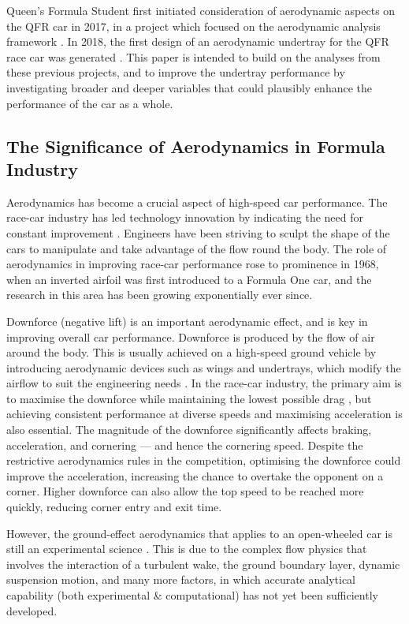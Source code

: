\noindent Queen's Formula Student first initiated consideration of aerodynamic aspects on the QFR car in 2017, in a project which focused on the aerodynamic analysis framework \cite{Corr2017MechanicalAuthor}. In 2018, the first design of an aerodynamic undertray for the QFR race car was generated \cite{McKeown2018DesignCar}. This paper is intended to build on the analyses from these previous projects, and to improve the undertray performance by investigating broader and deeper variables that could plausibly enhance the performance of the car as a whole. 

\subsection{The Significance of Aerodynamics in Formula Industry}
Aerodynamics has become a crucial aspect of high-speed car performance. The race-car industry has led technology innovation by indicating the need for constant improvement \cite{Zhang2006GroundCars}. Engineers have been striving to sculpt the shape of the cars to manipulate and take advantage of the flow round the body. The role of aerodynamics in improving race-car performance rose to prominence in 1968, when an inverted airfoil was first introduced to a Formula One car, and the research in this area has been growing exponentially ever since.

\noindent Downforce (negative lift) is an important aerodynamic effect, and is key in improving overall car performance. Downforce is produced by the flow of air around the body. This is usually achieved on a high-speed ground vehicle by introducing aerodynamic devices such as wings and undertrays, which modify the airflow to suit the engineering needs \cite{Wright1982TheCars}. In the race-car industry, the primary aim is to maximise the downforce while maintaining the lowest possible drag \cite{Zhang2006GroundCars}, but achieving consistent performance at diverse speeds and maximising acceleration is also essential. The magnitude of the downforce significantly affects braking, acceleration, and cornering --- and hence the cornering speed. Despite the restrictive aerodynamics rules in the competition, optimising the downforce could improve the acceleration, increasing the chance to overtake the opponent on a corner. Higher downforce can also allow the top speed to be reached more quickly, reducing corner entry and exit time. 

\noindent However, the ground-effect aerodynamics that applies to an open-wheeled car is still an experimental science \cite{Zhang2006GroundCars}. This is due to the complex flow physics that involves the interaction of a turbulent wake, the ground boundary layer, dynamic suspension motion, and many more factors, in which accurate analytical capability (both experimental \& computational) has not yet been sufficiently developed.

